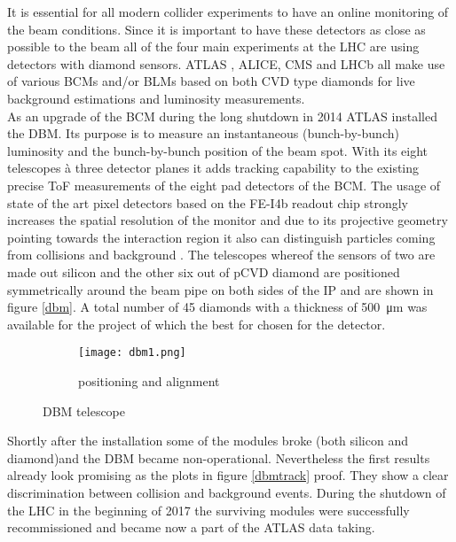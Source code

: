 It is essential for all modern collider experiments to have an online monitoring of the beam conditions. Since it is important to have these detectors as close as possible to the beam all of the four main experiments at the \ac{LHC} are using detectors with diamond sensors. ATLAS \cite{gorisek}, ALICE, CMS \cite{bartz} and LHCb \cite{domke} all make use of various \acp{BCM} and/or \acp{BLM} based on both \ac{CVD} type diamonds for live background estimations and luminosity measurements.\\
As an upgrade of the \ac{BCM} during the long shutdown in 2014 ATLAS installed the \ac{DBM}. Its purpose is to measure an instantaneous (bunch-by-bunch) luminosity and the bunch-by-bunch position of the beam spot. With its eight telescopes à three detector planes it adds tracking capability to the existing precise \ac{ToF} measurements of the eight pad detectors of the \ac{BCM}. The usage of state of the art pixel detectors based on the FE-I4b readout chip strongly increases the spatial resolution of the monitor and due to its projective geometry pointing towards the interaction region it also can distinguish particles coming from collisions and background \cite{dbm}. The telescopes whereof the sensors of two are made out silicon and the other six out of \ac{p}\ac{CVD} diamond are positioned symmetrically around the beam pipe on both sides of the \ac{IP} and are shown in figure \vref{dbm}. A total number of 45 diamonds with a thickness of \SI{500}{\micro\meter} was available for the project of which the best for chosen for the detector.

\begin{figure}
	\centering
	\begin{subfigure}{.66\textwidth}
		\centering
		\vspace*{.05\textheight}
		\texttt{[image: dbm1.png]}
		\vspace*{.02\textheight}
		\caption{positioning and alignment}
	\end{subfigure}
	\caption{\ac{DBM} telescope}
	\label{dbm}
\end{figure}

\noindent
Shortly after the installation some of the modules broke (both silicon and diamond)and the \ac{DBM} became non-operational. Nevertheless the first results already look promising as the plots in figure \vref{dbmtrack} proof. They show a clear discrimination between collision and background events. During the shutdown of the \ac{LHC} in the beginning of 2017 the surviving modules were successfully recommissioned and became now a part of the ATLAS data taking.

